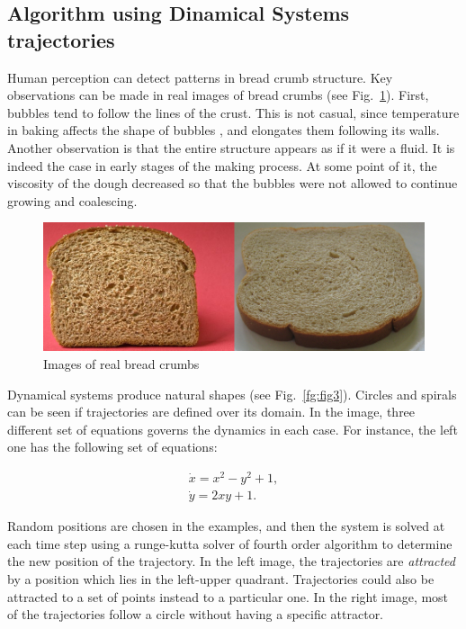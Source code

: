\documentclass[oneside,a4paper,english,links]{amca}
\begin{document}
\subsection{Algorithm using Dinamical Systems trajectories}

Human perception can detect patterns in bread crumb structure. Key observations can be made in real images of bread crumbs (see Fig.~\ref{fg:fig2}). First, bubbles tend to follow the lines of the crust. This is not casual, since temperature in baking affects the shape of bubbles \citep{Scanlon2001}, and elongates them following its walls. Another observation is that the entire structure appears as if it were a fluid. It is indeed the case in early stages of the making process. At some point of it, the viscosity of the dough decreased so that the bubbles were not allowed to continue growing and coalescing.

\begin{figure}[htb!]
  \centerline{\includegraphics[scale=0.45]{fig2}}
  \caption{Images of real bread crumbs}
  \label{fg:fig2}
\end{figure}

Dynamical systems produce natural shapes (see Fig.~\ref{fg:fig3}). Circles and spirals can be seen if trajectories are defined over its domain. In the image, three different set of equations governs the dynamics in each case. For instance, the left one has the following set of equations:

\begin{equation} \label{eq:simple}  
  \begin{aligned}
    \dot{x} = x^{2}-y^{2}+1,\\
    \dot{y} = 2xy+1.
  \end{aligned}
\end{equation}

Random positions are chosen in the examples, and then the system is solved at each time step using a runge-kutta solver of fourth order\citep{aa} algorithm to determine the new position of the trajectory. In the left image, the trajectories are {\em attracted} by a position which lies in the left-upper quadrant. Trajectories could also be attracted to a set of points instead to a particular one. In the right image, most of the trajectories follow a circle without having a specific attractor.
\end{document}
